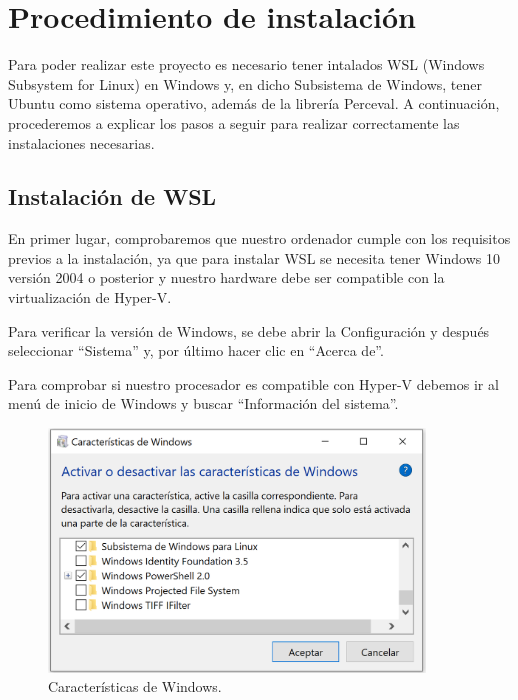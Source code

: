 \documentclass[a4paper, 12pt]{book}
\begin{document}
\section{Procedimiento de instalación} %
\label{sec:procedimiento de instalación}

Para poder realizar este proyecto es necesario tener intalados WSL (Windows Subsystem for Linux) en Windows y, en dicho Subsistema de Windows, tener Ubuntu como sistema operativo, además de la librería Perceval. 
A continuación, procederemos a explicar los pasos a seguir para realizar correctamente las instalaciones necesarias.

\subsection{Instalación de WSL} %
\label{sec:instalación de WSL}

En primer lugar, comprobaremos que nuestro ordenador cumple con los requisitos previos a la instalación, ya que para instalar WSL se necesita tener Windows 10 versión 2004 o posterior y nuestro hardware debe ser compatible con la virtualización de Hyper-V. 


Para verificar la versión de Windows, se debe abrir la Configuración y después seleccionar ``Sistema'' y, por último hacer clic en ``Acerca de''.


Para comprobar si nuestro procesador es compatible con Hyper-V debemos ir al menú de inicio de Windows y buscar ``Información del sistema''.

\begin{figure}
  \centering
  \includegraphics[width=10cm, keepaspectratio]{img/CaracteristicasWindows.PNG}
  \caption{Características de Windows.}\label{fig:CaracteristicasWindows}
\end{figure}
\end{document}

